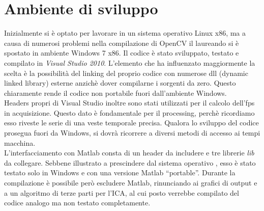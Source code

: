 \section{Ambiente di sviluppo}
Inizialmente si è optato per lavorare in un sistema operativo Linux x86, ma a causa di numerosi problemi nella compilazione di OpenCV il laureando si è spostato in ambiente Windows 7 x86. Il codice è stato sviluppato, testato e compilato in {\em Visual Studio 2010}.
L'elemento che ha influenzato maggiormente la scelta è la possibilità del linking del proprio codice con numerose dll (dynamic linked library) esterne anzichè dover compilarne i sorgenti da zero. Questo chiaramente rende il codice non portabile fuori dall'ambiente Windows. \\

Headers propri di Visual Studio inoltre sono stati utilizzati per il calcolo dell'fps in acquisizione. Questo dato è fondamentale per il processing, perchè ricordiamo esso riveste le serie di una veste temporale precisa. Qualora lo sviluppo del codice prosegua fuori da Windows, si dovrà ricorrere a diversi metodi di accesso ai tempi macchina. \\

L'interfacciamento con Matlab consta di un header da includere e tre librerie {\em lib} da collegare. Sebbene illustrato a prescindere dal sistema operativo \cite{MATLABC}, esso è stato testato solo in Windows e con una versione Matlab ``portable''. Durante la compilazione è possibile però escludere Matlab, rinunciando ai grafici di output e a un algoritmo di terze parti \cite{CARD} per l'ICA, al cui posto verrebbe compilato del codice analogo ma non testato completamente.